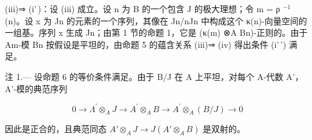 (iii)⇒ (i'\,)：设 (iii) 成立。设 n 为 B 的一个包含 J 的极大理想；令 m = ρ \(^{-1}\) (n)。设 x 为 Jn 的元素的一个序列，其像在 Jn/nJn 中构成这个 κ(n)-向量空间的一组基。序列 x 生成 Jn；由第 1 节的命题 1，它是 (κ(m) ⊗A Bn)-正则的。由于 Am-模 Bn 按假设是平坦的，由命题 5 的蕴含关系 (iii)⇒ (iv) 得出条件 (i'\,') 满足。

注 1.--- 设命题 6 的等价条件满足。由于 B/J 在 A 上平坦，对每个 A-代数 A'，A'-模的典范序列

\[
0 \rightarrow \Lambda^ {\prime} \otimes_ {A} J \longrightarrow A ^ {\prime} \otimes_ {A} B \longrightarrow A ^ {\prime} \otimes_ {A} (B / J) \rightarrow 0
\]

因此是正合的，且典范同态 \(A'\otimes_A J \longrightarrow J(A'\otimes_A B)\) 是双射的。

